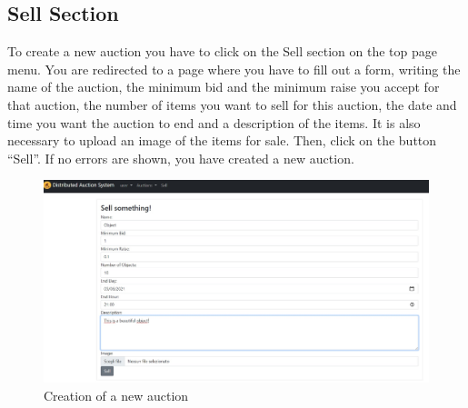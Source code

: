 \subsection{Sell Section}\label{subsec:manualsell}

To create a new auction you have to click on the Sell section on the top page
menu. You are redirected to a page where you have to fill out a form, writing
the name of the auction, the minimum bid and the minimum raise you accept for
that auction, the number of items you want to sell for this auction, the date
and time you want the auction to end and a description of the items. It is also
necessary to upload an image of the items for sale. Then, click on the button
``Sell''. If no errors are shown, you have created a new auction.

\begin{figure}[htb]
	\centering
	\includegraphics[width=\textwidth]{img/sell.jpg}
	\caption{Creation of a new auction}\label{fig:create-auction}
\end{figure}
